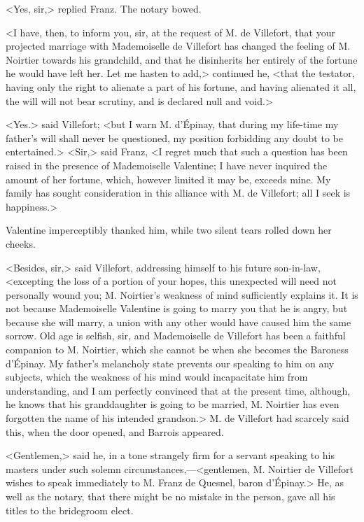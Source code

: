  <Yes, sir,> replied Franz. The notary bowed. 

 <I have, then, to inform you, sir, at the request of M. de Villefort, that your projected marriage with Mademoiselle de Villefort has changed the feeling of M. Noirtier towards his grandchild, and that he disinherits her entirely of the fortune he would have left her. Let me hasten to add,> continued he, <that the testator, having only the right to alienate a part of his fortune, and having alienated it all, the will will not bear scrutiny, and is declared null and void.> 

 <Yes.> said Villefort; <but I warn M. d'Épinay, that during my life-time my father's will shall never be questioned, my position forbidding any doubt to be entertained.>  <Sir,> said Franz, <I regret much that such a question has been raised in the presence of Mademoiselle Valentine; I have never inquired the amount of her fortune, which, however limited it may be, exceeds mine. My family has sought consideration in this alliance with M. de Villefort; all I seek is happiness.> 

 Valentine imperceptibly thanked him, while two silent tears rolled down her cheeks. 

 <Besides, sir,> said Villefort, addressing himself to his future son-in-law, <excepting the loss of a portion of your hopes, this unexpected will need not personally wound you; M. Noirtier's weakness of mind sufficiently explains it. It is not because Mademoiselle Valentine is going to marry you that he is angry, but because she will marry, a union with any other would have caused him the same sorrow. Old age is selfish, sir, and Mademoiselle de Villefort has been a faithful companion to M. Noirtier, which she cannot be when she becomes the Baroness d'Épinay. My father's melancholy state prevents our speaking to him on any subjects, which the weakness of his mind would incapacitate him from understanding, and I am perfectly convinced that at the present time, although, he knows that his granddaughter is going to be married, M. Noirtier has even forgotten the name of his intended grandson.> M. de Villefort had scarcely said this, when the door opened, and Barrois appeared. 

 <Gentlemen,> said he, in a tone strangely firm for a servant speaking to his masters under such solemn circumstances,—<gentlemen, M. Noirtier de Villefort wishes to speak immediately to M. Franz de Quesnel, baron d'Épinay.> He, as well as the notary, that there might be no mistake in the person, gave all his titles to the bridegroom elect. 

